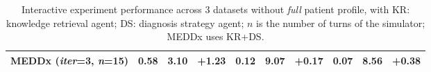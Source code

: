 \begin{table*}[ht]
\begin{tabular}{rccccccccc}
MEDDx (\textit{iter}=3, \textit{n}=15)                       & \textbf{0.58}           & \textbf{3.10}    &  +1.23 & 0.12        & 9.07     & +0.17     & 0.07         & 8.56    &  +0.38  \\  
\bottomrule
    \end{tabular}
    \vspace{-0.8em}
    \caption{Interactive experiment performance across 3 datasets without \textit{full} patient profile, with KR: knowledge retrieval agent; DS: diagnosis strategy agent; $n$ is the number of turns of the simulator; MEDDx uses KR+DS.
    }
    \label{tab:interactive_overall}
    \vspace{-1.8em}
\end{table*}